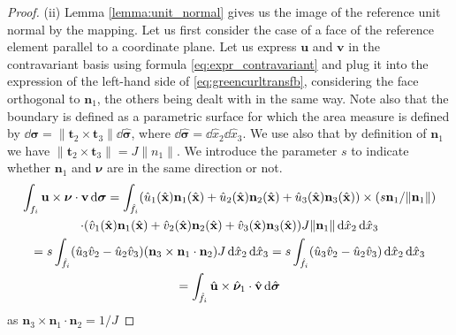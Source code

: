 \begin{proof}
(ii) Lemma \ref{lemma:unit_normal} gives us the image of the reference unit normal by the mapping.
Let us first consider the case of a face of the reference element parallel to a coordinate plane.
Let us  express $ \mathbf{u}$ and $ \mathbf{v}$ in the contravariant basis using formula \eqref{eq:expr_contravariant} and plug it into the expression of the left-hand side of \eqref{eq:greencurltransfb},
considering the face orthogonal to $ \mathbf{n}_1$, the others being dealt with in the same way. Note also that the boundary is defined as a parametric surface for which the area measure is defined by
$\dd \boldsymbol{\sigma} = \| \mathbf{t}_2\times \mathbf{t}_3 \| \dd \hat{ \boldsymbol{\sigma}}$, where
$ \dd \hat{ \boldsymbol{\sigma}} = \dd \hat{x}_2 \dd \hat{x}_3$. We use also that  by definition of
$ \mathbf{n}_1$ we have $\| \mathbf{t}_2\times \mathbf{t}_3 \| = J \| n_1\|$. We introduce the parameter $s$ to indicate whether $ \mathbf{n}_1$ and $ \mathbf{\nu}$ are in the same direction or not.
\begin{multline*}
\int_{f_i} \mathbf{u}\times \boldsymbol{\nu} \cdot \mathbf{v} \,{\rm d} \boldsymbol{\sigma} =\int_{\hat{f}_i} ( \hat{u}_1 (\hat{\mathbf{x}}) \mathbf{n}_1(\hat{\mathbf{x}}) + 
 \hat{u}_2 (\hat{\mathbf{x}}) \mathbf{n}_2(\hat{\mathbf{x}}) + \hat{u}_3 (\hat{\mathbf{x}}) \mathbf{n}_3(\hat{\mathbf{x}}))\times ( s \mathbf{n}_1/ \| \mathbf{n}_1\|) \\
 \cdot ( \hat{v}_1 (\hat{\mathbf{x}}) \mathbf{n}_1(\hat{\mathbf{x}}) + 
 \hat{v}_2 (\hat{\mathbf{x}}) \mathbf{n}_2(\hat{\mathbf{x}}) + \hat{v}_3 (\hat{\mathbf{x}}) \mathbf{n}_3(\hat{\mathbf{x}}) )J \| \mathbf{n}_1\| \,{\rm d}  \hat{x}_2 \,{\rm d} \hat{x}_3  \\
 =s \int_{\hat{f}_i} ( \hat{u}_3 \hat{v}_2 -  \hat{u}_2 \hat{v}_3) (\mathbf{n}_3\times \mathbf{n}_1 \cdot \mathbf{n}_2)
 J \,{\rm d}  \hat{x}_2 \,{\rm d} \hat{x}_3 = s \int_{\hat{f}_i} ( \hat{u}_3 \hat{v}_2 -  \hat{u}_2 \hat{v}_3)  \,{\rm d}  \hat{x}_2 \,{\rm d} \hat{x}_3 \\
  = \int_{\hat{f}_i} \hat{\mathbf{u}}\times\hat{\boldsymbol{\nu}}_1\cdot  \hat{\mathbf{v}} \,{\rm d}\hat{\boldsymbol{\sigma}}
\end{multline*}
as $\mathbf{n}_3\times \mathbf{n}_1 \cdot \mathbf{n}_2=1/J$
\end{proof}

